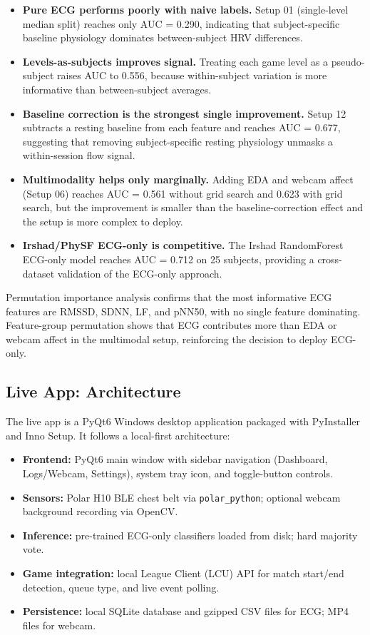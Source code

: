 \begin{itemize}
    \item \textbf{Pure ECG performs poorly with naive labels.} Setup 01 (single-level median split) reaches only AUC = 0.290, indicating that subject-specific baseline physiology dominates between-subject HRV differences.
    \item \textbf{Levels-as-subjects improves signal.} Treating each game level as a pseudo-subject raises AUC to 0.556, because within-subject variation is more informative than between-subject averages.
    \item \textbf{Baseline correction is the strongest single improvement.} Setup 12 subtracts a resting baseline from each feature and reaches AUC = 0.677, suggesting that removing subject-specific resting physiology unmasks a within-session flow signal.
    \item \textbf{Multimodality helps only marginally.} Adding EDA and webcam affect (Setup 06) reaches AUC = 0.561 without grid search and 0.623 with grid search, but the improvement is smaller than the baseline-correction effect and the setup is more complex to deploy.
    \item \textbf{Irshad/PhySF ECG-only is competitive.} The Irshad RandomForest ECG-only model reaches AUC = 0.712 on 25 subjects, providing a cross-dataset validation of the ECG-only approach.
\end{itemize}

Permutation importance analysis confirms that the most informative ECG features are RMSSD, SDNN, LF, and pNN50, with no single feature dominating. Feature-group permutation shows that ECG contributes more than EDA or webcam affect in the multimodal setup, reinforcing the decision to deploy ECG-only.

\subsection{Live App: Architecture}

The live app is a PyQt6 Windows desktop application packaged with PyInstaller and Inno Setup. It follows a local-first architecture:

\begin{itemize}
    \item \textbf{Frontend:} PyQt6 main window with sidebar navigation (Dashboard, Logs/Webcam, Settings), system tray icon, and toggle-button controls.
    \item \textbf{Sensors:} Polar H10 BLE chest belt via \texttt{polar\_python}; optional webcam background recording via OpenCV.
    \item \textbf{Inference:} pre-trained ECG-only classifiers loaded from disk; hard majority vote.
    \item \textbf{Game integration:} local League Client (LCU) API for match start/end detection, queue type, and live event polling.
    \item \textbf{Persistence:} local SQLite database and gzipped CSV files for ECG; MP4 files for webcam.
\end{itemize}

